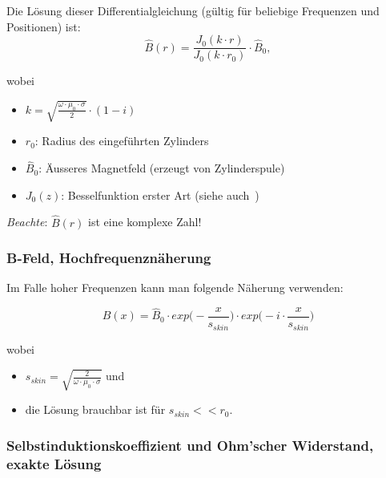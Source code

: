 Die L\"osung dieser Differentialgleichung (g\"ultig f\"ur beliebige Frequenzen und Positionen) ist:
\begin{equation}
    \label{eq:vollzylinder:bFeldExact}
    \hat{B} (r) = \frac{J_0 (k \cdot r)}{J_0 (k \cdot r_0)} \cdot \hat{B}_0,
\end{equation}

wobei
\begin{itemize}
    \item[]
        $k = \sqrt{\frac{\omega \cdot \mu_0 \cdot \sigma}{2}} \cdot (1-i)$
    \item[]
        $r_0$: Radius des eingef\"uhrten Zylinders
    \item[]
        $\hat{B}_0$: \"Ausseres Magnetfeld (erzeugt von Zylinderspule)
    \item[]
        $J_0(z)$: Besselfunktion erster Art (siehe auch~\cite{ref:wikipedia:bessel})
\end{itemize}

\emph{Beachte}: $\hat{B} (r)$ ist eine komplexe Zahl!


\subsubsection{B-Feld, Hochfrequenzn\"aherung}
\label{sec:arbgru:subsec:vollzylinder:bFeldapprox}


Im Falle hoher Frequenzen kann man folgende N\"aherung verwenden:

\begin{equation}
    \label{eq:vollzylinder:bFeldApprox}
    \hat{B} (x) = \hat{B}_0 \cdot exp\Biggl(-\frac{x}{s_{skin}} \Biggr) \cdot exp\Biggl(-i \cdot \frac{x}{s_{skin}} \Biggr)
\end{equation}

wobei
\begin{itemize}
    \item[]
        $s_{skin} = \sqrt{\frac{2}{\omega \cdot \mu_0 \cdot \sigma}}$ und
    \item[]
        die L\"osung brauchbar ist f\"ur $s_{skin} << r_0$.
\end{itemize}




\subsubsection{Selbstinduktionskoeffizient und Ohm'scher Widerstand, exakte L\"osung}
\label{sec:arbgru:subsec:vollzylinder:LRexakt}

